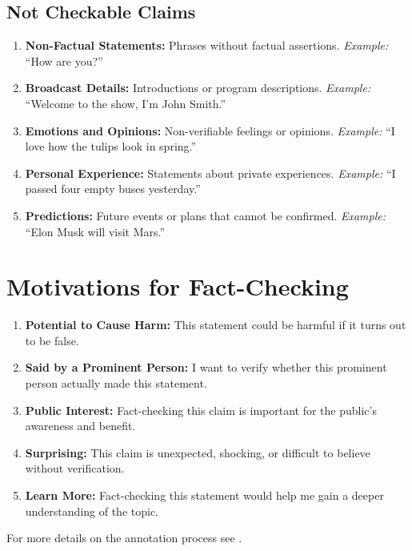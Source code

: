\subsection*{Not Checkable Claims}
\begin{enumerate}
    \item \textbf{Non-Factual Statements:} Phrases without factual assertions.  
    \textit{Example:} ``How are you?''
    
    \item \textbf{Broadcast Details:} Introductions or program descriptions.  
    \textit{Example:} ``Welcome to the show, I'm John Smith.''
    
    \item \textbf{Emotions and Opinions:} Non-verifiable feelings or opinions.  
    \textit{Example:} ``I love how the tulips look in spring.''
    
    \item \textbf{Personal Experience:} Statements about private experiences.  
    \textit{Example:} ``I passed four empty buses yesterday.''
    
    \item \textbf{Predictions:} Future events or plans that cannot be confirmed.  
    \textit{Example:} ``Elon Musk will visit Mars.''
\end{enumerate}

\section*{Motivations for Fact-Checking}
\begin{enumerate}
    \item \textbf{Potential to Cause Harm:} This statement could be harmful if it turns out to be false.
    \item \textbf{Said by a Prominent Person:} I want to verify whether this prominent person actually made this statement.
    \item \textbf{Public Interest:} Fact-checking this claim is important for the public's awareness and benefit.
    \item \textbf{Surprising:} This claim is unexpected, shocking, or difficult to believe without verification.
    \item \textbf{Learn More:} Fact-checking this statement would help me gain a deeper understanding of the topic.
\end{enumerate}

For more details on the annotation process see \cite{becker2023automated}.

